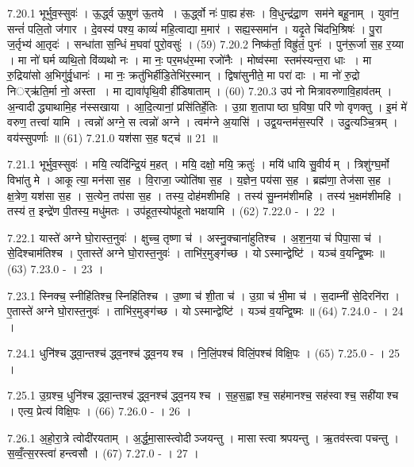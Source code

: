 7.20.1
भूर्भुव॒स्सुवः॑ । ऊ॒र्द्ध्व ऊ॒षुण॑ ऊ॒तये । ऊ॒र्द्ध्वो नः॑ पा॒ह्यह॑सः । वि॒धुन्द्र॑द्रा॒ण सम॑ने बहू॒नाम् । युवा॑न॒ सन्तं॑ पलि॒तो ज॑गार । दे॒वस्य॑ पश्य॒ काव्यं॑ महि॒त्वाद्या म॒मार॑ । सह्य॒स्समा॑न । यदृ॒ते चि॑दभि॒श्रिषः॑ । पु॒रा ज॒र्तृभ्य॑ आ॒तृदः॑ । सन्धा॑ता स॒न्धिं म॒घवा॑ पुरो॒वसुः॑ । (59)
7.20.2
निष्क॑र्ता॒ विह्रु॑तं॒ पुनः॑ । पुन॑रू॒र्जा स॒ह र॒य्या । मा नो॑ घर्म व्यथि॒तो वि॑व्यथो नः । मा नः॒ पर॒मध॑र॒म्मा रजो॑नैः । मोष्व॑स्मा स्तम॑स्यन्त॒रा धाः । मा रु॒द्रिया॑सो अ॒भिगु॑र्वृ॒धानः॑ । मा नः॒ क्रतु॑भिर्\mbox{}हीडि॒तेभि॑र॒स्मान् । द्विषा॑सुनीते॒ मा परा॑ दाः । मा नो॑ रु॒द्रो निर््ऋ॑ति॒र्मा नो॒ अस्ता । मा द्यावा॑पृथि॒वी ही॑डिषाताम् । (60)
7.20.3
उप॑ नो मित्रावरुणावि॒हाव॑तम् । अ॒न्वादीद्ध्याथामि॒ह न॑स्सखाया । आ॒दि॒त्यानां॒ प्रसि॑तिर्\mbox{}हे॒तिः । उ॒ग्रा श॒तापाष्ठा घ॒विषा॒ परि॑ णो वृणक्तु । इ॒मं मे॑ वरुण॒ तत्त्वा॑ यामि । त्वन्नो॑ अग्ने॒ स त्वन्नो॑ अग्ने । त्वम॑ग्ने अ॒यासि॑ । उद्व॒यन्तम॑स॒स्परि॑ । उदु॒त्यञ्चि॒त्रम् । वय॑स्सुपर्णाः ॥ (61)
7.21.0
यश॑सा स॒ह षट्च॑ ॥ 21 ॥
\anuvakamend

7.21.1
भूर्भुव॒स्सुवः॑ । मयि॒ त्यदि॑न्द्रि॒यं म॒हत् । मयि॒ दक्षो॒ मयि॒ क्रतुः॑ । मयि॑ धायि सु॒वीर्यम् । त्रिशु॑ग्घ॒र्मो विभा॑तु मे । आकूत्या॒ मन॑सा स॒ह । वि॒राजा॒ ज्योति॑षा स॒ह । य॒ज्ञेन॒ पय॑सा स॒ह । ब्रह्म॑णा॒ तेज॑सा स॒ह । क्ष॒त्रेण॒ यश॑सा स॒ह । स॒त्येन॒ तप॑सा स॒ह । तस्य॒ दोह॑मशीमहि । तस्य॑ सु॒म्नम॑शीमहि । तस्य॑ भ॒क्षम॑शीमहि । तस्य॑ त॒ इन्द्रे॑ण पी॒तस्य॒ मधु॑मतः । उप॑हूत॒स्योप॑हूतो भक्षयामि । (62)
7.22.0
- । 22 ।
\anuvakamend


7.22.1
यास्ते॑ अग्ने घो॒रास्त॒नुवः॑ । क्षुच्च॒ तृष्णा च॑ । अस्नु॒क्चाना॑हुतिश्च । अ॒श॒न॒या च॑ पिपा॒सा च॑ । से॒दिश्चाम॑तिश्च । ए॒तास्ते॑ अग्ने घो॒रास्त॒नुवः॑ । ताभि॑र॒मुङ्ग॑च्छ । योऽस्मान्द्वेष्टि॑ । यञ्च॑ व॒यन्द्वि॒ष्मः ॥ (63)
7.23.0
- । 23 ।
\anuvakamend

7.23.1
स्निक्च॒ स्नीहि॑तिश्च॒ स्निहि॑तिश्च । उ॒ष्णा च॑ शी॒ता च॑ । उ॒ग्रा च॑ भी॒मा च॑ । स॒दाम्नी॑ से॒दिरनि॑रा । ए॒तास्ते॑ अग्ने घो॒रास्त॒नुवः॑ । ताभि॑र॒मुङ्ग॑च्छ । योऽस्मान्द्वेष्टि॑ । यञ्च॑ व॒यन्द्वि॒ष्मः ॥ (64)
7.24.0
- । 24 ।
\anuvakamend

7.24.1
धुनि॑श्च द्ध्वा॒न्तश्च॑ द्ध्व॒नश्च॑ द्ध्व॒नयश्च । नि॒लिं॒पश्च॑ विलिं॒पश्च॑ विक्षि॒पः । (65)
7.25.0
- । 25 ।
\anuvakamend

7.25.1
उ॒ग्रश्च॒ धुनि॑श्च द्ध्वा॒न्तश्च॑ द्ध्व॒नश्च॑ द्ध्व॒नयश्च । स॒ह॒स॒ह्वाश्च॒ सह॑मानश्च॒ सह॑स्वाश्च॒ सही॑याश्च । एत्य॒ प्रेत्य॑ विक्षि॒पः । (66)
7.26.0
- । 26 ।
\anuvakamend

7.26.1
अ॒हो॒रा॒त्रे त्वोदी॑रयताम् । अ॒र्द्ध॒मा॒सास्त्वोदीञ्जयन्तु । मासास्त्वा श्रपयन्तु । ऋ॒तव॑स्त्वा पचन्तु । स॒व्वँ॒त्स॒रस्त्वा॑ हन्त्वसौ । (67)
7.27.0
- । 27 ।
\anuvakamend

